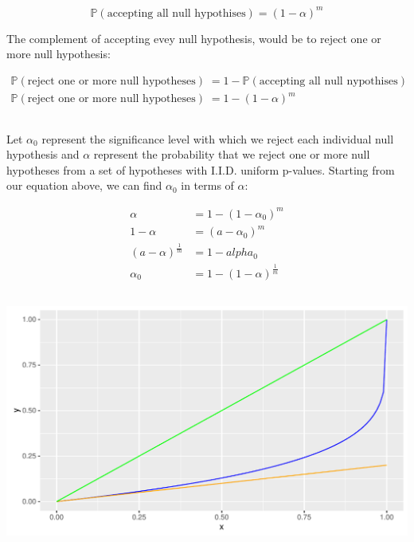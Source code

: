 \documentclass[a4paper,12pt]{article}\usepackage[]{graphicx}\usepackage[]{color}
\makeatletter
\def\maxwidth{ %
  \ifdim\Gin@nat@width>\linewidth
    \linewidth
  \else
    \Gin@nat@width
  \fi
}
\newenvironment{knitrout}{}{} %
\makeatother
\begin{document}
$$
\mathbb{P}(\textrm{accepting all null hypothises}) = (1 - \alpha)^m
$$

The complement of accepting evey null hypothesis, would be to reject one or more null hypothesis:

\begin{align*}
\mathbb{P}(\textrm{reject one or more null hypotheses}) &= 1 - \mathbb{P}(\textrm{accepting all null nypothises}) \\
\mathbb{P}(\textrm{reject one or more null hypotheses}) &= 1 - (1 - \alpha)^m
\end{align*}


\subsection{}

Let $\alpha_0$ represent the significance level with which we reject each individual null hypothesis and $\alpha$ represent the probability that we reject one or more null hypotheses from a set of hypotheses with I.I.D. uniform p-values. Starting from our equation above, we can find $\alpha_0$ in terms of $\alpha$:

\begin{align*}
\alpha &= 1 - (1 - \alpha_0)^m \\
1 - \alpha &= (a - \alpha_0)^m \\
(a - \alpha)^{\frac{1}{m}} &= 1 - alpha_0 \\
\alpha_0 &= 1 - (1 - \alpha)^{\frac{1}{m}}
\end{align*}

\subsection{}

\begin{knitrout}
\color{fgcolor}
\includegraphics[width=\maxwidth]{figure/coefficients-1} 

\end{knitrout}
\end{document}
